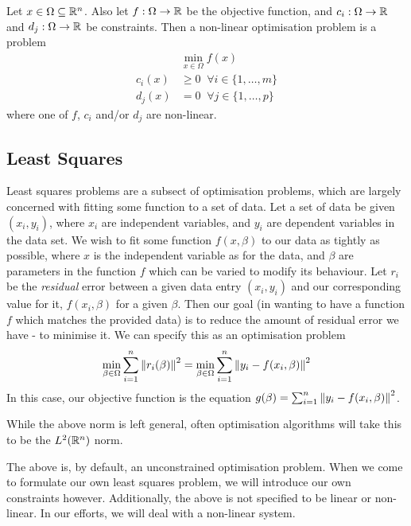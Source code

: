 \begin{definition}
    Let $x \in \Omega \subseteq \mathbb{R}^n$. Also let $f:\Omega \to \mathbb{R}$ be the objective function, and $c_i :\Omega \to \mathbb{R}$ and $d_j : \Omega \to \mathbb{R}$ be 
    constraints. Then a non-linear optimisation problem is a problem
    \begin{align*}
        &\min_{x \in \Omega} f(x) \\
        c_i(x) &\ge 0 \;\; \forall i \in \lbrace 1, \dots, m \rbrace \\
        d_j(x) &= 0 \;\; \forall j \in \lbrace 1, \dots, p \rbrace
    \end{align*}
    where one of $f$, $c_i$ and/or $d_j$ are non-linear.
\end{definition}


\subsection{Least Squares}

Least squares problems are a subsect of optimisation problems, which are largely concerned with fitting some function to 
a set of data. Let a set of data be given $(x_i, y_i)$, where $x_i$ are independent variables, and $y_i$ are dependent variables in 
the data set. We wish to fit some function $f(x, \beta)$ to our data as tightly as possible, where $x$ is the independent variable 
as for the data, and $\beta$ are parameters in the function $f$ which can be varied to modify its behaviour. Let $r_i$ be the \textit{residual} error between 
a given data entry $(x_i, y_i)$ and our corresponding value for it, $f(x_i, \beta)$ for a given $\beta$. Then our goal 
(in wanting to have a function $f$ which matches the provided data) is to reduce the amount of residual error we have - to minimise it. 
We can specify this as an optimisation problem \cite{carlone-least-squares}
\begin{align*}
    \min_{\beta \in \Omega} \sum_{i = 1}^{n} \norm{r_i(\beta)}^2 = \min_{\beta \in \Omega} \sum_{i = 1}^{n} \norm{y_i - f(x_i, \beta)}^2
\end{align*}
In this case, our objective function is the equation $g(\beta) = \sum_{i = 1}^{n} \norm{y_i - f(x_i, \beta)}^2$.

\begin{remark}
    While the above norm is left general, often optimisation algorithms will take this to be the $L^2(\mathbb{R}^n)$ norm.
\end{remark}
\begin{remark}
    The above is, by default, an unconstrained optimisation problem. When we come to formulate our own least squares problem, we will 
    introduce our own constraints however. Additionally, the above is not specified to be linear or non-linear. In our efforts, 
    we will deal with a non-linear system.
\end{remark}

